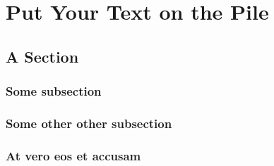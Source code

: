 
\chapter{Put Your Text on the Pile}


\section{A Section}

\subsection{Some subsection}

\subsection{Some other other subsection}

\subsection{At vero eos et accusam}
